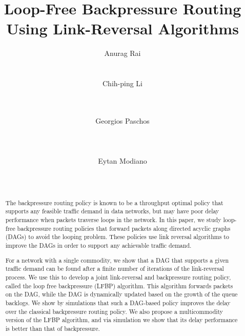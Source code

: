 \documentclass{sig-alternate-2013}
\begin{document}
\title{Loop-Free Backpressure Routing \\ Using Link-Reversal Algorithms}
\author{
\alignauthor
Anurag Rai\\
       \\
       \\
\alignauthor
Chih-ping Li\\
	\\
	\\
\and
\alignauthor
Georgios Paschos\\
	\\
	\\
	\\
\alignauthor
Eytan Modiano\\
       \\
       \\
}

\maketitle
\begin{abstract}
The backpressure routing policy is known to be a throughput optimal policy that supports any feasible traffic demand in data networks, but may have poor delay performance when packets traverse loops in the network. In this paper, we study loop-free backpressure routing policies that forward packets along directed acyclic graphs (DAGs) to avoid the looping problem. These policies use link reversal algorithms to improve the DAGs in order to support any achievable traffic demand.

For a network with a single commodity, we show that a DAG that supports a given traffic demand can be found after a finite number of iterations of the link-reversal process. We use this to develop a joint link-reversal and backpressure routing policy, called the loop free backpressure (LFBP) algorithm. This algorithm forwards packets on the DAG, while the DAG is dynamically updated based on the growth of the queue backlogs. We show by simulations that such a DAG-based policy improves the delay over the classical backpressure routing policy. We also propose a multicommodity version of the LFBP algorithm, and via simulation we show that its delay performance is better than that of backpressure.


\end{abstract}
\end{document}
